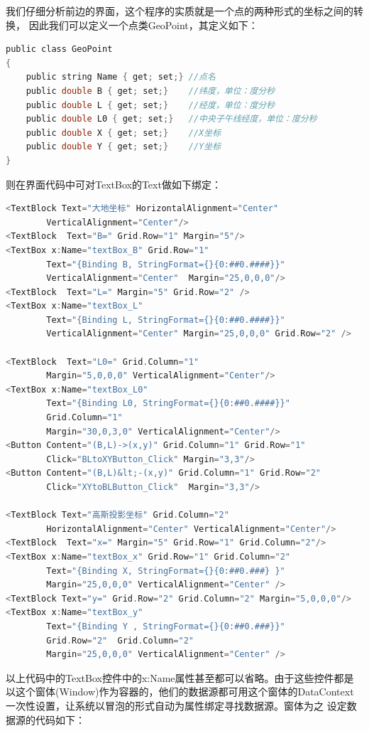 我们仔细分析前边的界面，这个程序的实质就是一个点的两种形式的坐标之间的转换，
因此我们可以定义一个点类GeoPoint，其定义如下：

\begin{lstlisting}[language=C]
public class GeoPoint
{
    public string Name { get; set;} //点名
    public double B { get; set;}    //纬度，单位：度分秒
    public double L { get; set;}    //经度，单位：度分秒
    public double L0 { get; set;}   //中央子午线经度，单位：度分秒
    public double X { get; set;}    //X坐标
    public double Y { get; set;}    //Y坐标
}
\end{lstlisting}

则在界面代码中可对TextBox的Text做如下绑定：

\begin{lstlisting}[language=C]
<TextBlock Text="大地坐标" HorizontalAlignment="Center"
        VerticalAlignment="Center"/>
<TextBlock  Text="B=" Grid.Row="1" Margin="5"/>
<TextBox x:Name="textBox_B" Grid.Row="1"
        Text="{Binding B, StringFormat={}{0:##0.####}}"
        VerticalAlignment="Center"  Margin="25,0,0,0"/>
<TextBlock  Text="L=" Margin="5" Grid.Row="2" />
<TextBox x:Name="textBox_L"
        Text="{Binding L, StringFormat={}{0:##0.####}}"
        VerticalAlignment="Center" Margin="25,0,0,0" Grid.Row="2" />

<TextBlock  Text="L0=" Grid.Column="1"
        Margin="5,0,0,0" VerticalAlignment="Center"/>
<TextBox x:Name="textBox_L0"
        Text="{Binding L0, StringFormat={}{0:##0.####}}" 
        Grid.Column="1"
        Margin="30,0,3,0" VerticalAlignment="Center"/>
<Button Content="(B,L)->(x,y)" Grid.Column="1" Grid.Row="1"
        Click="BLtoXYButton_Click" Margin="3,3"/>
<Button Content="(B,L)&lt;-(x,y)" Grid.Column="1" Grid.Row="2"
        Click="XYtoBLButton_Click"  Margin="3,3"/>
        
<TextBlock Text="高斯投影坐标" Grid.Column="2"
        HorizontalAlignment="Center" VerticalAlignment="Center"/>
<TextBlock  Text="x=" Margin="5" Grid.Row="1" Grid.Column="2"/>
<TextBox x:Name="textBox_x" Grid.Row="1" Grid.Column="2"
        Text="{Binding X, StringFormat={}{0:##0.###} }"
        Margin="25,0,0,0" VerticalAlignment="Center" />
<TextBlock Text="y=" Grid.Row="2" Grid.Column="2" Margin="5,0,0,0"/>
<TextBox x:Name="textBox_y"
        Text="{Binding Y , StringFormat={}{0:##0.###}}"
        Grid.Row="2"  Grid.Column="2"
        Margin="25,0,0,0" VerticalAlignment="Center" />  
\end{lstlisting}

以上代码中的TextBox控件中的x:Name属性甚至都可以省略。由于这些控件都是
以这个窗体(Window)作为容器的，他们的数据源都可用这个窗体的DataContext
一次性设置，让系统以冒泡的形式自动为属性绑定寻找数据源。窗体为之
设定数据源的代码如下：

